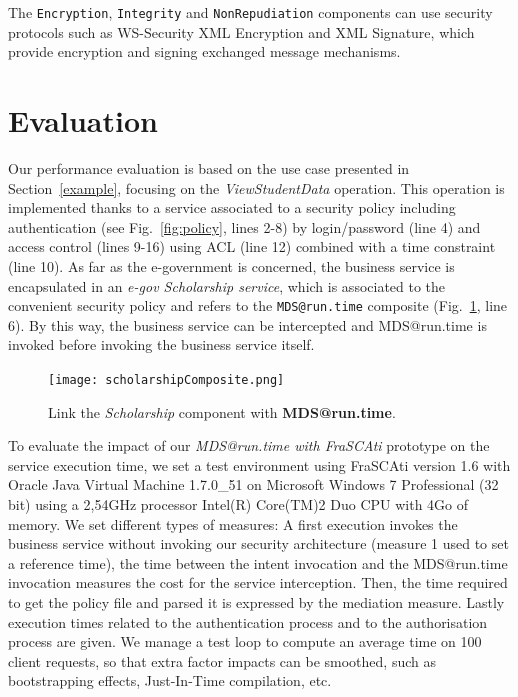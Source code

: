 \documentclass[runningheads,a4paper]{llncs}
\begin{document}
The \texttt{Encryption}, \texttt{Integrity} and \texttt{NonRepudiation} components can use security protocols such as WS-Security XML Encryption and XML Signature, which provide encryption and signing exchanged message mechanisms.


\section{Evaluation}

\label{sec:evaluation}


 Our performance evaluation is based on the use case presented in Section~\ref{example}, focusing on the \textit{ViewStudentData} operation. This operation is implemented thanks to a service associated to a security policy including authentication (see Fig.~\ref{fig:policy}, lines 2-8) by login/password (line 4) and access control (lines 9-16) using ACL (line 12) combined with a time constraint (line 10). As far as the e-government is concerned, the business service is encapsulated in an \textit{e-gov Scholarship service}, which is associated to the convenient security policy and refers to the \texttt{MDS@run.time} composite (Fig.~\ref{fig:gestionEtudiant}, line 6). By this way, the business service can be intercepted and MDS@run.time is invoked before invoking the business service itself.

\begin{figure}  
\center
\texttt{[image: scholarshipComposite.png]}
\caption{Link the \emph{Scholarship} component with \textbf{MDS@run.time}.}
\label{fig:gestionEtudiant}
\end{figure}



To evaluate the impact of our \textit{MDS@run.time with FraSCAti} prototype on the service execution time, we set a test environment using FraSCAti version 1.6 with Oracle Java Virtual Machine 1.7.0\_51 on Microsoft Windows 7 Professional (32 bit) using a 2,54GHz processor Intel(R) Core(TM)2 Duo CPU with 4Go of memory.
We set different types of measures: A first execution invokes the business service without invoking our security architecture (measure 1 used to set a reference time), the time between the intent invocation and the MDS@run.time invocation measures the cost for the service interception. Then, the time required to get the policy file and parsed it is expressed by the mediation measure. Lastly execution times related to the authentication process and to the authorisation process are given.
We manage a test loop to compute an average time on 100 client requests, so that extra factor impacts can be smoothed, such as bootstrapping effects, Just-In-Time compilation, etc.
\end{document}
